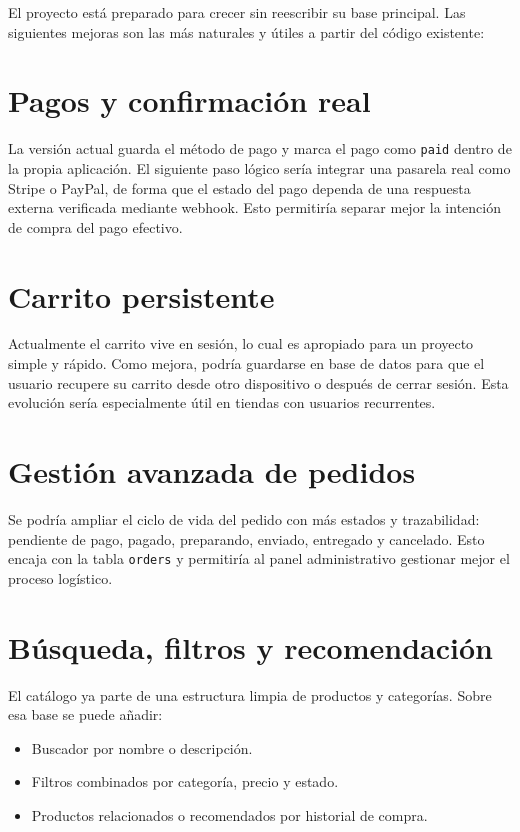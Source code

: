 \documentclass[12pt,a4paper]{report}
\begin{document}
El proyecto está preparado para crecer sin reescribir su base principal. Las siguientes mejoras son las más naturales y útiles a partir del código existente:

\section{Pagos y confirmación real}

La versión actual guarda el método de pago y marca el pago como \texttt{paid} dentro de la propia aplicación. El siguiente paso lógico sería integrar una pasarela real como Stripe o PayPal, de forma que el estado del pago dependa de una respuesta externa verificada mediante webhook. Esto permitiría separar mejor la intención de compra del pago efectivo.

\section{Carrito persistente}

Actualmente el carrito vive en sesión, lo cual es apropiado para un proyecto simple y rápido. Como mejora, podría guardarse en base de datos para que el usuario recupere su carrito desde otro dispositivo o después de cerrar sesión. Esta evolución sería especialmente útil en tiendas con usuarios recurrentes.

\section{Gestión avanzada de pedidos}

Se podría ampliar el ciclo de vida del pedido con más estados y trazabilidad: pendiente de pago, pagado, preparando, enviado, entregado y cancelado. Esto encaja con la tabla \texttt{orders} y permitiría al panel administrativo gestionar mejor el proceso logístico.

\section{Búsqueda, filtros y recomendación}

El catálogo ya parte de una estructura limpia de productos y categorías. Sobre esa base se puede añadir:

\begin{itemize}
  \item Buscador por nombre o descripción.
  \item Filtros combinados por categoría, precio y estado.
  \item Productos relacionados o recomendados por historial de compra.
\end{itemize}
\end{document}

